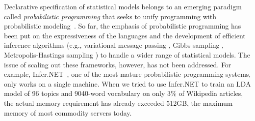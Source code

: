 Declarative specification of statistical models belongs to an emerging paradigm
called {\em probabilistic programming} that seeks to unify programming with
probabilistic modeling~\cite{pp}.
%
So far, the emphasis of probabilistic programming has been put on the
expressiveness of the languages and the development of efficient inference
algorithms (e.g., variational message passing \cite{vmp}, Gibbs sampling \cite{gibbs},
Metropolis-Hastings sampling \cite{mh}) to handle a wider range of statistical
models.  The issue of scaling out these frameworks, however, has not been
addressed.  For example, Infer.NET~\cite{InferNET14}, one of the most
mature probabilistic programming systems, only works on a single machine.  
When we tried to use Infer.NET to train an LDA model of 96 topics and 9040-word
vocabulary on only 3\% of Wikipedia articles, the actual memory
requirement has already exceeded 512GB, the maximum memory of most commodity
servers today.

